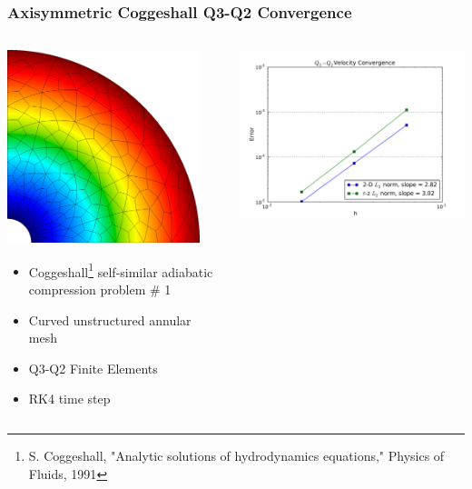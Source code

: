 \documentclass[notes=hide,8pt,xcolor=svgnames]{beamer}
\begin{document}
\begin{frame}
\frametitle{Axisymmetric Coggeshall Q3-Q2 Convergence}
\begin{columns}
\begin{column}{0.4\textwidth}
\includegraphics[width=0.9\textwidth]{figures/CoggMesh_Q3Q2.png}
\begin{itemize}
\item Coggeshall\footnote[1]{\tiny S. Coggeshall, "Analytic solutions of
hydrodynamics equations," Physics of Fluids, 1991} self-similar adiabatic
compression problem \# 1
\item Curved unstructured annular mesh
\item Q3-Q2 Finite Elements
\item RK4 time step
\end{itemize}
\bigskip
\end{column}
\begin{column}{0.45\textwidth}
\includegraphics[width=1\textwidth]{figures/CoggErrorQ3Q2_V.pdf}

\end{column}
\end{columns}
\end{frame}
\end{document}
